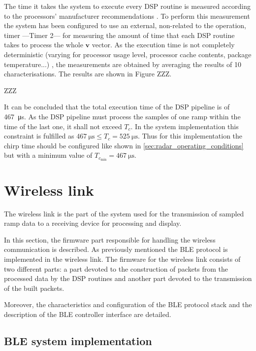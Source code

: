 The time it takes the system to execute every DSP routine is measured according to the processors' manufacturer recommendations \cite{ARM2020}. To perform this measurement the system has been configured to use an external, non-related to the operation, timer ---Timer 2--- for measuring the amount of time that each DSP routine takes to process the whole $\mathbf{v}$ vector. As the execution time is not completely deterministic (varying for processor usage level, processor cache contents, package temperature...) \cite{ARM2020} %
, the measurements are obtained by averaging the results of 10 characterisations. The results are shown in Figure ZZZ.

ZZZ

It can be concluded that the total execution time of the DSP pipeline is of \SI{467}{\micro\second}. As the DSP pipeline must process the samples of one ramp within the time of the last one, it shall not exceed $T_c$. In the system implementation this constraint is fulfilled as $\SI{467}{\micro\second} \le T_c = \SI{525}{\micro\second}$. Thus for this implementation the chirp time should be configured like shown in \cref{sec:radar_operating_conditions} but with a minimum value of $T_{c_{\min}} = \SI{467}{\micro\second}$.

\section{Wireless link} \label{sec:wireless_link}

The wireless link is the part of the system used for the transmission of sampled ramp data to a receiving device for processing and display.

In this section, the firmware part responsible for handling the wireless communication is described. As previously mentioned the BLE protocol is implemented in the wireless link. The firmware for the wireless link consists of two different parts: a part devoted to the construction of packets from the processed data by the DSP routines and another part devoted to the transmission of the built packets.

Moreover, the characteristics and configuration of the BLE protocol stack and the description of the BLE controller interface are detailed.

\subsection{BLE system implementation}

